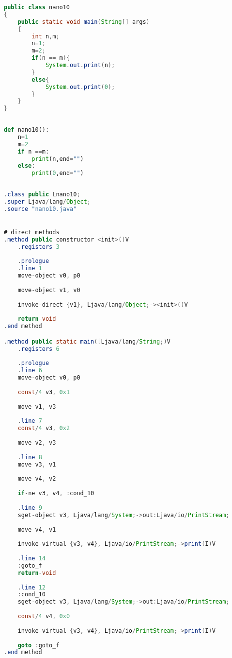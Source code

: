 \documentclass[hidelinks,12pt]{article}
\begin{document}
	\begin{lstlisting}[caption=Código em Java,language=java]
public class nano10
{
	public static void main(String[] args)
	{
		int n,m;
		n=1;
		m=2;
		if(n == m){
			System.out.print(n);
		}
		else{
			System.out.print(0);
		}
	}
}	
	
	\end{lstlisting}
	
	\begin{lstlisting}[caption=Código em python,language=Python]
def nano10():
	n=1 
	m=2
	if n ==m:
		print(n,end="")
	else:
		print(0,end="")	
	
	\end{lstlisting}
	
	\begin{lstlisting}[caption=Smali resultante do .java,language=java]
.class public Lnano10;
.super Ljava/lang/Object;
.source "nano10.java"


# direct methods
.method public constructor <init>()V
	.registers 3
	
	.prologue
	.line 1
	move-object v0, p0
	
	move-object v1, v0
	
	invoke-direct {v1}, Ljava/lang/Object;-><init>()V
	
	return-void
.end method

.method public static main([Ljava/lang/String;)V
	.registers 6
	
	.prologue
	.line 6
	move-object v0, p0
	
	const/4 v3, 0x1
	
	move v1, v3
	
	.line 7
	const/4 v3, 0x2
	
	move v2, v3
	
	.line 8
	move v3, v1
	
	move v4, v2
	
	if-ne v3, v4, :cond_10
	
	.line 9
	sget-object v3, Ljava/lang/System;->out:Ljava/io/PrintStream;
	
	move v4, v1
	
	invoke-virtual {v3, v4}, Ljava/io/PrintStream;->print(I)V
	
	.line 14
	:goto_f
	return-void
	
	.line 12
	:cond_10
	sget-object v3, Ljava/lang/System;->out:Ljava/io/PrintStream;
	
	const/4 v4, 0x0
	
	invoke-virtual {v3, v4}, Ljava/io/PrintStream;->print(I)V
	
	goto :goto_f
.end method	
	
	\end{lstlisting}
	
\end{document}

